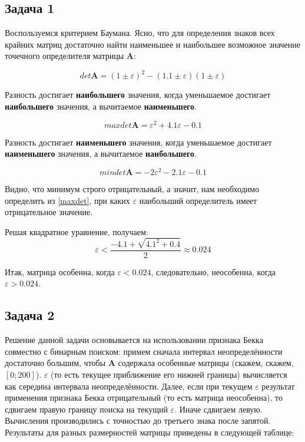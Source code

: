\subsection{Задача 1}

Воспользуемся критерием Баумана. Ясно, что для определения знаков всех крайних матриц достаточно найти наименьшее и наибольшее возможное значение точечного определителя матрицы $\mathbf{A}$:

\begin{equation}
det \mathbf{A} = (1 \pm \varepsilon) ^ 2 - (1.1 \pm \varepsilon)(1 \pm \varepsilon)
\end{equation}

Разность достигает \textbf{наибольшего} значения, когда уменьшаемое достигает \textbf{наибольшего} значения, а вычитаемое \textbf{наименьшего}.
	
\begin{equation} \label{maxdet}
max det \mathbf{A} = \varepsilon ^2 + 4.1 \varepsilon - 0.1
\end{equation}	

Разность достигает \textbf{наименьшего} значения, когда уменьшаемое достигает  \textbf{наименьшего} значения, а вычитаемое \textbf{наибольшего}.

\begin{equation}
min det \mathbf{A} = - 2 \varepsilon ^2 - 2.1 \varepsilon - 0.1
\end{equation}	

Видно, что минимум строго отрицательный, а значит, нам необходимо определить из \ref{maxdet}, при каких $\varepsilon$ наибольший определитель имеет отрицательное значение.

Решая квадратное уравнение, получаем:
\begin{equation}
	\varepsilon < \frac{-4.1 + \sqrt{4.1 ^ 2 + 0.4}}{2} \approx 0.024
\end{equation}

Итак, матрица особенна, когда $\varepsilon < 0.024$, следовательно, неособенна, когда $\varepsilon > 0.024$.

\subsection{Задача 2}
Решение данной задачи основывается на использовании признака Бекка совместно с бинарным поиском: примем сначала интервал неопределённости достаточно большим, чтобы $\mathbf{A}$ содержала особенные матрицы (скажем, скажем, $[0; 200]$). $\varepsilon$ (то есть текущее приближение его нижней границы) вычисляется как середина интервала неопределённости. Далее, если при текущем $\varepsilon$ результат применения признака Бекка отрицательный (то есть матрица неособенна), то сдвигаем правую границу поиска на текущий $\varepsilon$. Иначе сдвигаем левую. Вычисления производились с точностью до третьего знака после запятой. Результаты для разных размерностей матрицы приведены в следующей таблице:

